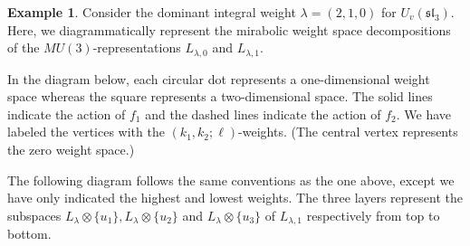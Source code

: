 \documentclass{amsart}
\numberwithin{equation}{section}
\theoremstyle{theorem}
\theoremstyle{definition}
\newtheorem{example}[theorem]{Example}
\begin{document}
\begin{example}
Consider the dominant integral weight $\lambda=(2,1,0)$ for $U_v(\mathfrak{sl}_3)$. Here, we diagrammatically represent the mirabolic weight space decompositions of the $MU(3)$-representations $L_{\lambda,0}$ and $L_{\lambda,1}$.

In the diagram below, each circular dot represents a one-dimensional weight space whereas the square represents a two-dimensional space. The solid lines indicate the action of $f_1$ and the dashed lines indicate the action of $f_2$. We have labeled the vertices with the $(k_1,k_2;\ell)$-weights. (The central vertex represents the zero weight space.)

\begin{center}
\end{center}


The following diagram follows the same conventions as the one above, except we have only indicated the highest and lowest weights. The three layers represent the subspaces $L_{\lambda}\otimes\{u_1\}, L_{\lambda}\otimes\{u_2\}$ and $L_{\lambda}\otimes\{u_3\}$ of $L_{\lambda, 1}$ respectively from top to bottom.


\end{example}
\end{document}
